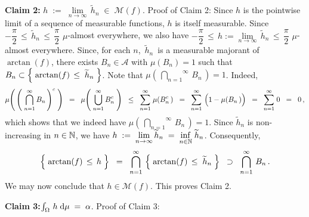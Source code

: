 \vskip 0.8cm
\noindent
\textbf{Claim 2:}\quad
$h \; := \; \underset{n\rightarrow\infty}{\lim}\,\widetilde{h}_{n} \; \in \; \mathcal{M}(f)$.
\vskip 0.1cm
\noindent
Proof of Claim 2:\;\;
Since $h$ is the pointwise limit of a sequence of measurable functions, $h$ is itself measurable.
Since \;$-\dfrac{\pi}{2} \, \leq \, \widetilde{h}_{n} \, \leq \, \dfrac{\pi}{2}$\; $\mu$-almost everywhere, we also have
\;$-\dfrac{\pi}{2} \, \leq \, h := \underset{n\rightarrow\infty}{\lim} \, \widetilde{h}_{n} \, \leq \, \dfrac{\pi}{2}$\; $\mu$-almost everywhere.
Since, for each $n$, \,$\widetilde{h}_{n}$\, is a measurable majorant of $\arctan(f)$, there exists
$B_{n} \in \mathcal{A}$ with $\mu(B_{n}) = 1$ such that
$B_{n} \subset \left\{\;\arctan(f) \,\overset{{\color{white}.}}{\leq}\; \widetilde{h}_{n}\;\right\}$.
Note that $\mu\!\left(\,\overset{\infty}{\underset{n=1}{\bigcap}}\,B_{n}\,\right) = 1$.
Indeed,
\begin{equation*}
\mu\!\left(\,\left(\;\overset{\infty}{\underset{n=1}{\bigcap}}\,B_{n}\,\right)^{c}\;\right)
\;\; = \;\;
	\mu\!\left(\;\overset{\infty}{\underset{n=1}{\bigcup}}\,B_{n}^{c}\;\right)
\;\; \leq \;\;
	\overset{\infty}{\underset{n=1}{\sum}}\;\mu\!\left(B_{n}^{c}\,\right)
\;\; = \;\;
	\overset{\infty}{\underset{n=1}{\sum}}\,\left(1 \overset{{\color{white}.}}{-} \mu\!\left(B_{n}\,\right)\right)
\;\; = \;\;
	\overset{\infty}{\underset{n=1}{\sum}}\;0
\;\; = \;\;
	0\,,
\end{equation*}
which shows that we indeed have $\mu\!\left(\,\overset{\infty}{\underset{n=1}{\bigcap}}\,B_{n}\,\right) = 1$.
Since $\widetilde{h}_{n}$ is non-increasing in $n \in \mathbb{N}$, we have
$h \; := \; \underset{n\rightarrow\infty}{\lim}\,\widetilde{h}_{n} \; = \; \underset{n\in\mathbb{N}}{\inf}\;\widetilde{h}_{n}$.
Consequently,
\begin{equation*}
\left\{\;\arctan(f) \,\overset{{\color{white}.}}{\leq}\, h\;\right\}
\;\; = \;\;
	\bigcap_{n=1}^{\infty}\,\left\{\;\arctan(f) \,\overset{{\color{white}.}}{\leq}\; \widetilde{h}_{n}\;\right\}
\;\; \supset \;\;
	\bigcap_{n=1}^{\infty}\,B_{n}\,.
\end{equation*}
We may now conclude that $h \in \mathcal{M}(f)$. This proves Claim 2.

\vskip 0.8cm
\noindent
\textbf{Claim 3:}\quad $\int_{\Omega}\, h \; \textnormal{d}\mu \; = \; \alpha$.
\vskip 0.1cm
\noindent
Proof of Claim 3:

